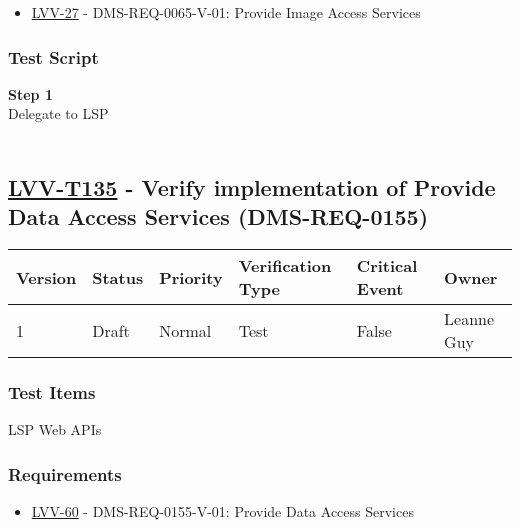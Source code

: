 \begin{itemize}
\tightlist
\item
  \href{https://jira.lsstcorp.org/browse/LVV-27}{LVV-27} -
  DMS-REQ-0065-V-01: Provide Image Access Services
\end{itemize}

\hypertarget{test-script-111}{%
\subsubsection{Test Script}\label{test-script-111}}

\textbf{Step 1}\\
Delegate to LSP\\
~\\

\hypertarget{lvv-t135---verify-implementation-of-provide-data-access-services-dms-req-0155}{%
\subsection{\texorpdfstring{\href{https://jira.lsstcorp.org/secure/Tests.jspa\#/testCase/LVV-T135}{LVV-T135}
- Verify implementation of Provide Data Access Services
(DMS-REQ-0155)}{LVV-T135 - Verify implementation of Provide Data Access Services (DMS-REQ-0155)}}\label{lvv-t135---verify-implementation-of-provide-data-access-services-dms-req-0155}}

\begin{longtable}[]{@{}llllll@{}}
\toprule
Version & Status & Priority & Verification Type & Critical Event &
Owner\tabularnewline
\midrule
\endhead
1 & Draft & Normal & Test & False & Leanne Guy\tabularnewline
\bottomrule
\end{longtable}

\hypertarget{test-items-111}{%
\subsubsection{Test Items}\label{test-items-111}}

LSP Web APIs~

\hypertarget{requirements-112}{%
\subsubsection{Requirements}\label{requirements-112}}

\begin{itemize}
\tightlist
\item
  \href{https://jira.lsstcorp.org/browse/LVV-60}{LVV-60} -
  DMS-REQ-0155-V-01: Provide Data Access Services
\end{itemize}

